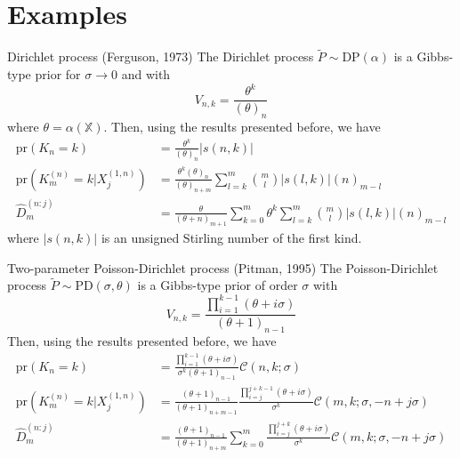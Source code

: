 \documentclass[11pt]{beamer}
\begin{document}
\section{Examples}

\begin{frame}{Dirichlet process (Ferguson, 1973)}
    The Dirichlet process \(\tilde{P} \sim \text{DP}(\alpha)\) is a Gibbs-type prior for \(\sigma \to 0\) and with
    \begin{equation*}
        V_{n,k} = \frac{\theta^k}{(\theta)_{n}}
    \end{equation*}
    where \(\theta = \alpha(\mathbb{X})\). Then, using the results presented before, we have
    \begin{align*}
        \text{pr}(K_n = k) &= \frac{\theta^k}{(\theta)_{n}} |s(n,k)|\\
        \text{pr}(K_m^{(n)} = k | X_j^{(1,n)}) &= \frac{\theta^k (\theta)_n}{(\theta)_{n + m}} \sum_{l = k}^m \binom{m}{l} |s(l, k)| (n)_{m - l}\\
        \hat{D}_m^{(n:j)} &= \frac{\theta}{(\theta + n)_{m + 1}} \sum_{k = 0}^m \theta^k \sum_{l = k}^{m} \binom{m}{l} |s(l, k)| (n)_{m - l}
    \end{align*}
    where \(|s(n, k)|\) is an unsigned Stirling number of the first kind.
\end{frame}

\begin{frame}{Two-parameter Poisson-Dirichlet process (Pitman, 1995)}
    The Poisson-Dirichlet process \(\tilde{P} \sim \text{PD}(\sigma, \theta)\) is a Gibbs-type prior of order \(\sigma\) with
    \begin{equation*}
        V_{n,k} = \frac{\prod_{i=1}^{k-1}(\theta + i \sigma)}{(\theta + 1)_{n - 1}}
    \end{equation*}
    Then, using the results presented before, we have
    \begin{align*}
        \text{pr}(K_n = k) &= \frac{\prod_{i=1}^{k-1}(\theta + i \sigma)}{\sigma^k (\theta + 1)_{n - 1}} \mathscr{C}(n, k; \sigma)\\
        \text{pr}(K_m^{(n)} = k | X_j^{(1,n)}) &= \frac{(\theta + 1)_{n - 1}}{(\theta + 1)_{n + m - 1}} \frac{\prod_{i=j}^{j+k-1}(\theta + i \sigma)}{\sigma^k} \mathscr{C}(m, k; \sigma, -n + j \sigma)\\
        \hat{D}_m^{(n:j)} &= \frac{(\theta + 1)_{n - 1}}{(\theta + 1)_{n + m}} \sum_{k=0}^m \frac{\prod_{i=j}^{j+k}(\theta + i \sigma)}{\sigma^k} \mathscr{C}(m, k; \sigma, -n + j \sigma)
    \end{align*}
\end{frame}
\end{document}
